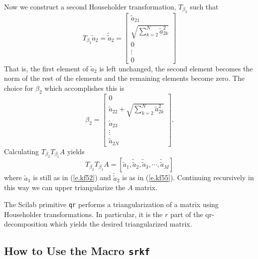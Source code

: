 	Now we construct a second Householder transformation,
$T_{\beta_2}$ such that
%
\begin{equation}
T_{\beta_2}\tilde{a}_2=\tilde{\tilde{a}}_2=
                          \left[\begin{array}{c}
                          \tilde{a}_{21}\\
                          \sqrt{\sum_{k=2}^{N}\tilde{a}_{2k}^2}\\
                          0\\
                          \vdots\\
                          0
                      \end{array}\right]
\label{e.kf55}
\end{equation}
%
That is, the first element of $\tilde{a}_2$ is left unchanged,
the second element becomes the norm of the rest of the elements and
the remaining elements become zero.  The choice for $\beta_2$ which
accomplishes this is
%
\begin{equation}
\beta_2=\left[\begin{array}{c}
                      0\\    
                      \tilde{a}_{22}+\sqrt{\sum_{k=2}^{N}\tilde{a}_{2k}^2}\\
                          \tilde{a}_{23}\\
                          \vdots\\
                          \tilde{a}_{2N}
                      \end{array}\right].
\label{e.kf56}
\end{equation}
%
Calculating $T_{\beta_2}T_{\beta_1}A$ yields
%
\begin{equation}
T_{\beta_2}T_{\beta_1}A=[\tilde{a}_1,\tilde{\tilde{a}}_2,
                                     \tilde{\tilde{a}}_3,
                                     \cdots,
                                     \tilde{\tilde{a}}_M]
\label{e.kf57}
\end{equation}
%
where $\tilde{a}_1$ is still as in (\ref{e.kf52}) and $\tilde{\tilde{a}}_2$
is as in (\ref{e.kf55}).  Continuing recursively in this way we can
upper triangularize the $A$ matrix.

	The Scilab primitive {\tt qr} performs a triangularization of
a matrix using Householder transformations.  In particular, it is
the $r$ part of the qr-decomposition which yields the 
desired triangularized matrix.

\subsection{How to Use the Macro {\tt srkf}}


